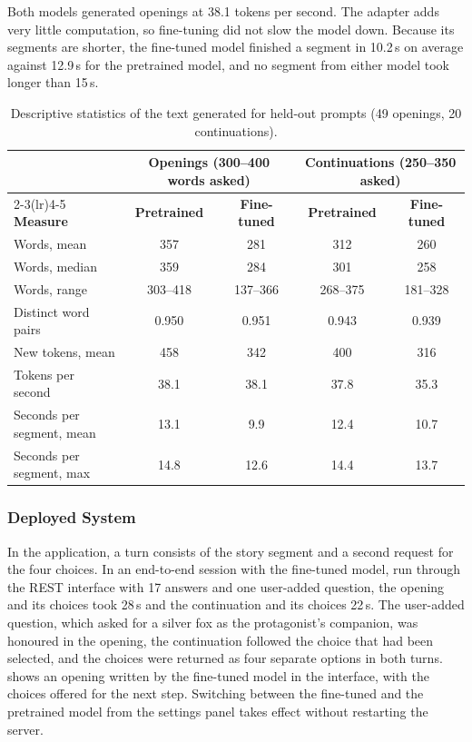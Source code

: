 Both models generated openings at 38.1 tokens per second. The adapter adds very little computation, so fine-tuning did not slow the model down. Because its segments are shorter, the fine-tuned model finished a segment in 10.2\,s on average against 12.9\,s for the pretrained model, and no segment from either model took longer than 15\,s.

\begin{table}[H]
\centering
\caption{Descriptive statistics of the text generated for held-out prompts (49 openings, 20 continuations).}
\label{tab:gen-desc}
\renewcommand{\arraystretch}{1.2}
\small
\begin{tabular}{@{}lcccc@{}}
\toprule
 & \multicolumn{2}{c}{\textbf{Openings} (300--400 words asked)} & \multicolumn{2}{c}{\textbf{Continuations} (250--350 asked)} \\
\cmidrule(lr){2-3}\cmidrule(lr){4-5}
\textbf{Measure} & \textbf{Pretrained} & \textbf{Fine-tuned} & \textbf{Pretrained} & \textbf{Fine-tuned} \\
\midrule
Words, mean            & 357 & 281 & 312 & 260 \\
Words, median          & 359 & 284 & 301 & 258 \\
Words, range           & 303--418 & 137--366 & 268--375 & 181--328 \\
Distinct word pairs    & 0.950 & 0.951 & 0.943 & 0.939 \\
New tokens, mean       & 458 & 342 & 400 & 316 \\
Tokens per second      & 38.1 & 38.1 & 37.8 & 35.3 \\
Seconds per segment, mean & 13.1 & 9.9 & 12.4 & 10.7 \\
Seconds per segment, max  & 14.8 & 12.6 & 14.4 & 13.7 \\
\bottomrule
\end{tabular}
\end{table}

\subsubsection{Deployed System}

In the application, a turn consists of the story segment and a second request for the four choices. In an end-to-end session with the fine-tuned model, run through the REST interface with 17 answers and one user-added question, the opening and its choices took 28\,s and the continuation and its choices 22\,s. The user-added question, which asked for a silver fox as the protagonist's companion, was honoured in the opening, the continuation followed the choice that had been selected, and the choices were returned as four separate options in both turns.  shows an opening written by the fine-tuned model in the interface, with the choices offered for the next step. Switching between the fine-tuned and the pretrained model from the settings panel takes effect without restarting the server.

